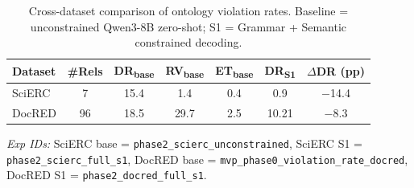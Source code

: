 \begin{table}[t]
\centering
\caption{Cross-dataset comparison of ontology violation rates.
Baseline = unconstrained Qwen3-8B zero-shot; S1 = Grammar + Semantic constrained decoding.}
\label{tab:cross-dataset}
\begin{tabular}{l c ccc cc}
\toprule
Dataset & \#Rels & DR\textsubscript{base} & RV\textsubscript{base} & ET\textsubscript{base} & DR\textsubscript{S1} & $\Delta$DR (pp) \\
\midrule
SciERC & 7  & 15.4 & 1.4  & 0.4 & 0.9          & $-$14.4 \\
DocRED & 96 & 18.5 & 29.7 & 2.5 & 10.21 & $-$8.3 \\
\bottomrule
\end{tabular}
\vspace{2pt}
{\footnotesize
\textit{Exp IDs:}
SciERC base = \texttt{phase2\_scierc\_unconstrained},
SciERC S1 = \texttt{phase2\_scierc\_full\_s1},
DocRED base = \texttt{mvp\_phase0\_violation\_rate\_docred},
DocRED S1 = \texttt{phase2\_docred\_full\_s1}.
}
\end{table}
